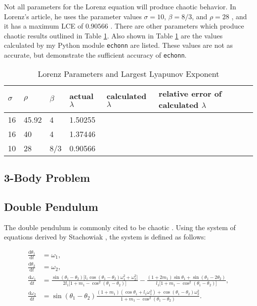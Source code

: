 \documentclass{article}
\newcommand{\der}[2][t]{\frac{\mathrm{d}#2}{\mathrm{d}#1}}
\begin{document}
Not all parameters for the Lorenz equation will produce chaotic behavior. In 
Lorenz's article, he uses the parameter values $\sigma=10$, $\beta=8/3$, and
$\rho=28$ \cite{lorenz1963deterministic}, and it has a maximum LCE of $0.90566$ 
\cite{viswanath1998lyapunov}. There are other parameters which
produce chaotic results outlined in Table \ref{table:lorenz_params}. Also shown 
in Table \ref{table:lorenz_params} are the values calculated by my Python
module \texttt{echonn} are listed. These values are not as accurate, but 
demonstrate the sufficient accuracy of \texttt{echonn}.

\begin{table}[H]
    \centering
    \begin{tabular}{|l|l|l|l|l|l|l|}
        \hline
        $\sigma$ & $\rho$ & $\beta$ & actual $\lambda$ & calculated $\lambda$ & relative error of calculated $\lambda$ \\
        \hline \hline
        16 & 45.92 & 4 & 1.50255 & & \\
        16 & 40 & 4 & 1.37446 & & \\
        10 & 28 & 8/3 & 0.90566 & & \\
        \hline
    \end{tabular}
    \caption{
        Lorenz Parameters and Largest Lyapunov Exponent
        \cite{viswanath1998lyapunov}
    }
    \label{table:lorenz_params}
\end{table}

\subsection{3-Body Problem}

\subsection{Double Pendulum}

The double pendulum is commonly cited to be chaotic 
\cite{stachowiak2006numerical} \cite{levien1993double}. Using the system 
of equations derived by Stachowiak \cite{stachowiak2006numerical}, the system is
defined as follows:

\begin{align}
    \der{\theta_1} &= \omega_1, \nonumber \\
    \der{\theta_2} &= \omega_2, \nonumber \\
    \der{\omega_1} &= 
    \frac{
        \sin(\theta_1 - \theta_2) \lbrack
            l_1 \cos(\theta_1 - \theta_2) \omega_1^2 + \omega_2^2
        \rbrack
    }{
        2 l_1 \lbrack
            1 + m_1 - \cos^2(\theta_1 - \theta_2)
        \rbrack
    }
    -
    \frac{
        (1 + 2 m_1) \sin \theta_1 + \sin(\theta_1 - 2 \theta_2)
    }{
        l_1 \lbrack
            1 + m_1 - \cos^2(\theta_1 - \theta_2)
        \rbrack
    }
    , \nonumber \\
    \der{\omega_2} &= \sin (\theta_1 - \theta_2) 
    \frac{
        (1+m_1) (\cos \theta_1 + l_1 \omega_1^2)
        +
        \cos(\theta_1 - \theta_2) \omega_2^2
    }{
        1 + m_1 - \cos^2(\theta_1 - \theta_2)
    }. \label{eq:doub_pen}
\end{align}
\end{document}
